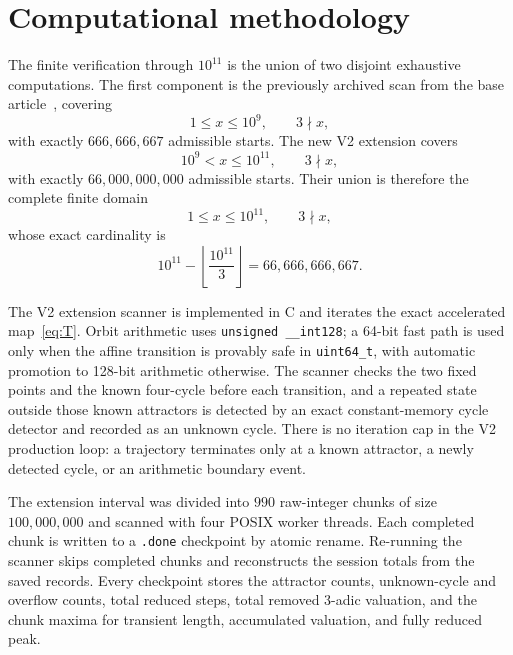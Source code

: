 \documentclass[11pt]{article}
\begin{document}
\section{Computational methodology}
The finite verification through $10^{11}$ is the union of two disjoint exhaustive computations.  The first component is the previously archived scan from the base article~\cite{banazadeh2026base}, covering
\[
1\le x\le10^9,\qquad 3\nmid x,
\]
with exactly $666,666,667$ admissible starts.  The new V2 extension covers
\[
10^9<x\le10^{11},\qquad 3\nmid x,
\]
with exactly $66,000,000,000$ admissible starts.  Their union is therefore the complete finite domain
\[
1\le x\le10^{11},\qquad3\nmid x,
\]
whose exact cardinality is
\begin{equation}
10^{11}-\left\lfloor\frac{10^{11}}{3}\right\rfloor
=66,666,666,667.
\end{equation}

The V2 extension scanner is implemented in C and iterates the exact accelerated map~\eqref{eq:T}.  Orbit arithmetic uses \texttt{unsigned \_\_int128}; a 64-bit fast path is used only when the affine transition is provably safe in \texttt{uint64\_t}, with automatic promotion to 128-bit arithmetic otherwise.  The scanner checks the two fixed points and the known four-cycle before each transition, and a repeated state outside those known attractors is detected by an exact constant-memory cycle detector and recorded as an unknown cycle.  There is no iteration cap in the V2 production loop: a trajectory terminates only at a known attractor, a newly detected cycle, or an arithmetic boundary event.

The extension interval was divided into $990$ raw-integer chunks of size $100,000,000$ and scanned with four POSIX worker threads.  Each completed chunk is written to a \texttt{.done} checkpoint by atomic rename.  Re-running the scanner skips completed chunks and reconstructs the session totals from the saved records.  Every checkpoint stores the attractor counts, unknown-cycle and overflow counts, total reduced steps, total removed $3$-adic valuation, and the chunk maxima for transient length, accumulated valuation, and fully reduced peak.
\end{document}
